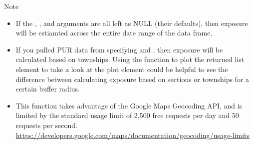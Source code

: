 \documentclass[a4paper]{book}
\begin{document}
%
\begin{Section}{Note}

\begin{itemize}

\item If the , , and 
arguments are all left as NULL (their defaults), then exposure will
be estiamted across the entire date range of the 
data frame.
\item If you pulled PUR data from  specifying
 and , then
exposure will be calculated based on townships. Using the
 function to plot the returned 
list element to take a look at the  plot element
could be helpful to see the difference between calculating exposure
based on sections or townships for a certain buffer radius.
\item This function takes advantage of the Google Maps Geocoding API, and
is limited by the standard usage limit of 2,500 free requests per
day and 50 requests per second.
\url{https://developers.google.com/maps/documentation/geocoding/usage-limits}

\end{itemize}

\end{Section}
%
\end{document}
